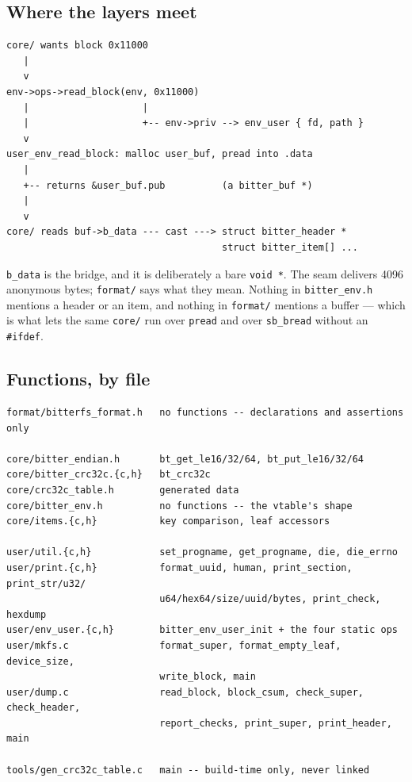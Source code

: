 \subsection{Where the layers meet}

\begin{lstlisting}[style=shell]
core/ wants block 0x11000
   |
   v
env->ops->read_block(env, 0x11000)
   |                    |
   |                    +-- env->priv --> env_user { fd, path }
   v
user_env_read_block: malloc user_buf, pread into .data
   |
   +-- returns &user_buf.pub          (a bitter_buf *)
   |
   v
core/ reads buf->b_data --- cast ---> struct bitter_header *
                                      struct bitter_item[] ...
\end{lstlisting}

\lstinline|b_data| is the bridge, and it is deliberately a bare
\lstinline|void *|. The seam delivers 4096 anonymous bytes; \texttt{format/}
says what they mean. Nothing in \lstinline|bitter_env.h| mentions a header or
an item, and nothing in \lstinline|format/| mentions a buffer --- which is what
lets the same \texttt{core/} run over \texttt{pread} and over
\lstinline|sb_bread| without an \texttt{\#ifdef}.

\subsection{Functions, by file}

\begin{lstlisting}[style=shell]
format/bitterfs_format.h   no functions -- declarations and assertions only

core/bitter_endian.h       bt_get_le16/32/64, bt_put_le16/32/64
core/bitter_crc32c.{c,h}   bt_crc32c
core/crc32c_table.h        generated data
core/bitter_env.h          no functions -- the vtable's shape
core/items.{c,h}           key comparison, leaf accessors

user/util.{c,h}            set_progname, get_progname, die, die_errno
user/print.{c,h}           format_uuid, human, print_section, print_str/u32/
                           u64/hex64/size/uuid/bytes, print_check, hexdump
user/env_user.{c,h}        bitter_env_user_init + the four static ops
user/mkfs.c                format_super, format_empty_leaf, device_size,
                           write_block, main
user/dump.c                read_block, block_csum, check_super, check_header,
                           report_checks, print_super, print_header, main

tools/gen_crc32c_table.c   main -- build-time only, never linked
\end{lstlisting}

